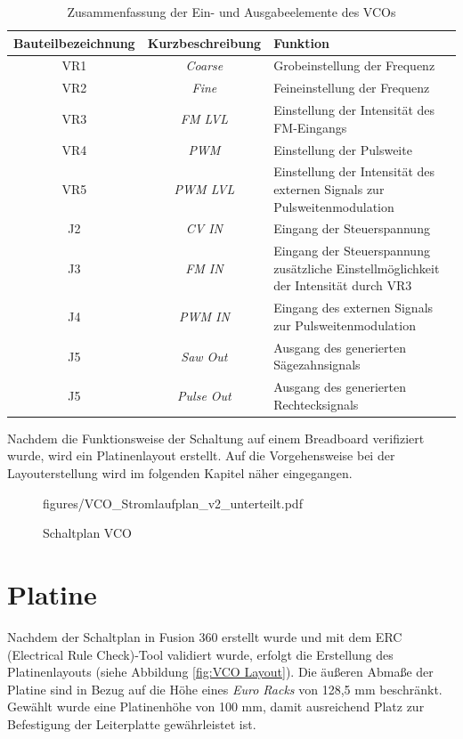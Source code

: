 \begin{table}[h]
	\centering
	\caption{Zusammenfassung der Ein- und Ausgabeelemente des VCOs}
	\begin{tabular}{|c|c|p{8cm}|}
		\hline
		Bauteilbezeichnung & Kurzbeschreibung & Funktion \\
		\hline
		VR1 & \textit{Coarse} & Grobeinstellung der Frequenz \\
		\hline
		VR2 & \textit{Fine} & Feineinstellung der Frequenz \\
		\hline
		VR3 & \textit{FM LVL} & Einstellung der Intensität des FM-Eingangs \\
		\hline
		VR4 & \textit{PWM} & Einstellung der Pulsweite\\
		\hline
		VR5 & \textit{PWM LVL} &  Einstellung der Intensität des externen Signals zur Pulsweitenmodulation \\
		\hline
		J2 &  \textit{CV IN} & Eingang der Steuerspannung \\
		\hline
		J3 & \textit{FM IN} & Eingang der Steuerspannung \newline zusätzliche Einstellmöglichkeit der Intensität durch VR3 \\
		\hline
		J4 & \textit{PWM IN} &  Eingang des externen Signals zur Pulsweitenmodulation\\
		\hline
		J5 & \textit{Saw Out} &  Ausgang des generierten Sägezahnsignals\\
		\hline
		J5 & \textit{Pulse Out} &  Ausgang des generierten Rechtecksignals \\
		\hline
	\end{tabular}
\end{table}


Nachdem die Funktionsweise der Schaltung auf einem Breadboard verifiziert wurde, wird ein Platinenlayout erstellt.
Auf die Vorgehensweise bei der Layouterstellung wird im folgenden Kapitel näher eingegangen.



\newpage
\begin{figure}[h]
\centering
 {figures/VCO_Stromlaufplan_v2_unterteilt.pdf}
\caption{Schaltplan VCO}
\label{fig:VCO_Stromlaufplan}
\end{figure}

\newpage

\section{Platine}
Nachdem der Schaltplan in Fusion 360 erstellt wurde und mit dem ERC (Electrical Rule Check)-Tool validiert wurde, erfolgt die Erstellung des Platinenlayouts (siehe Abbildung \ref{fig:VCO Layout}).
Die äußeren Abmaße der Platine sind in Bezug auf die Höhe eines \textit{Euro Racks} von 128,5 mm beschränkt. 
Gewählt wurde eine Platinenhöhe von 100 mm, damit ausreichend Platz zur Befestigung der Leiterplatte gewährleistet ist.

